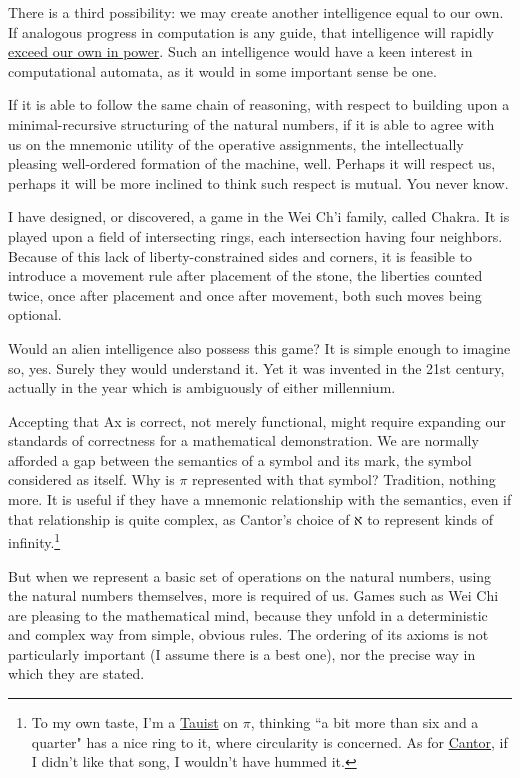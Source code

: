 \documentclass[twoside]{article}
\begin{document}
There is a third possibility: we may create another intelligence equal to our own. If analogous progress in computation is any guide, that intelligence will rapidly \href{http://slatestarcodex.com/2015/05/22/ai-researchers-on-ai-risk/}{exceed our own in power}. Such an intelligence would have a keen interest in computational automata, as it would in some important sense be one.

If it is able to follow the same chain of reasoning, with respect to building upon a minimal-recursive structuring of the natural numbers, if it is able to agree with us on the mnemonic utility of the operative assignments, the intellectually pleasing well-ordered formation of the machine, well. Perhaps it will respect us, perhaps it will be more inclined to think such respect is mutual. You never know.

I have designed, or discovered, a game in the Wei Ch'i family, called Chakra. It is played upon a field of intersecting rings, each intersection having four neighbors. Because of this lack of liberty-constrained sides and corners, it is feasible to introduce a movement rule after placement of the stone, the liberties counted twice, once after placement and once after movement, both such moves being optional.

Would an alien intelligence also possess this game? It is simple enough to imagine so, yes. Surely they would understand it. Yet it was invented in the 21st century, actually in the year which is ambiguously of either millennium.

Accepting that Ax is correct, not merely functional, might require expanding our standards of correctness for a mathematical demonstration. We are normally afforded a gap between the semantics of a symbol and its mark, the symbol considered as itself. Why is $\pi$ represented with that symbol? Tradition, nothing more. It is useful if they have a mnemonic relationship with the semantics, even if that relationship is quite complex, as Cantor's choice of א to represent kinds of infinity.\footnote{To my own taste, I'm a \href{https://tauday.com/}{Tauist} on $\pi$, thinking ``a bit more than six and a quarter" has a nice ring to it, where circularity is concerned. As for \href{https://en.wikipedia.org/wiki/Georg_Cantor}{Cantor}, if I didn't like that song, I wouldn't have hummed it.}

But when we represent a basic set of operations on the natural numbers, using the natural numbers themselves, more is required of us. Games such as Wei Chi are pleasing to the mathematical mind, because they unfold in a deterministic and complex way from simple, obvious rules. The ordering of its axioms is not particularly important (I assume there is a best one), nor the precise way in which they are stated.
\end{document}
